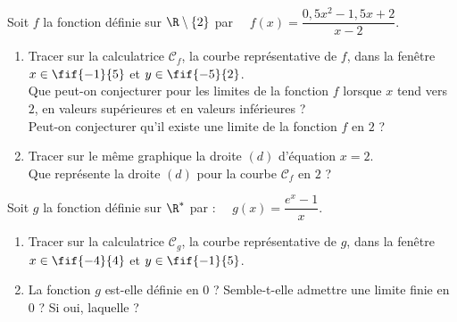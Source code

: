 \documentclass[a4paper,11pt,exos]{nsi} %
\begin{document}
Soit $f$ la fonction définie sur $\R\setminus\{2\}$ par $\quad f(x)= \dfrac{0,5x^2-1,5x+2}{x-2}$.
\begin{enumerate}
	\item \faCalculator\hspace*{.3cm}Tracer sur la calculatrice $\mathcal{C}_f$, la courbe représentative de $f$, dans la fenêtre $x\in\fif{-1}{5}$ et $y\in\fif{-5}{2}$.\\
	Que peut-on conjecturer pour les limites de la fonction $f$ lorsque $x$ tend vers $2$, en valeurs supérieures et en valeurs inférieures ?\\
	Peut-on conjecturer qu'il existe une limite de la fonction $f$ en $2$ ?
	\item Tracer sur le même graphique la droite $(d)$ d'équation $x=2$.\\
	Que représente la droite $(d)$ pour la courbe $\mathcal{C}_f$ en $2$ ?
\end{enumerate}

Soit $g$ la fonction définie sur $\R^*$ par : $\quad g(x)=\dfrac{e^x-1}{x}$.
\begin{enumerate}
	\item \faCalculator\hspace*{.3cm}Tracer sur la calculatrice $\mathcal{C}_g$, la courbe représentative de $g$, dans la fenêtre $x\in\fif{-4}{4}$ et $y\in\fif{-1}{5}$.
	\item La fonction $g$ est-elle définie en $0$ ? Semble-t-elle admettre une limite finie en $0$ ? Si oui, laquelle ?
\end{enumerate}
\end{document}
